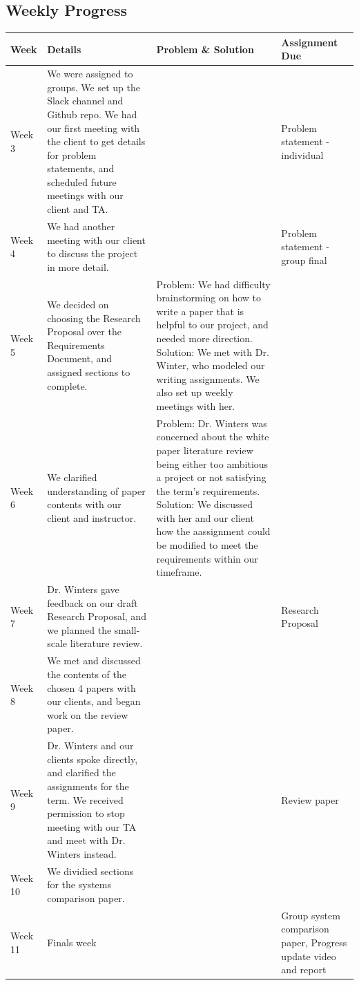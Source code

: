 \documentclass[onecolumn, draftclsnofoot,10pt, compsoc]{IEEEtran}
\begin{document}
\subsection{Weekly Progress}
\begin{tabular}{l | p{5 cm} | p{6 cm}  | p{5 cm} }
    Week & Details & Problem \& Solution & Assignment Due \\ \hline
    Week 3 & We were assigned to groups. We set up the Slack channel and Github repo. We had our first meeting with the client to get details for problem statements, and scheduled future meetings with our client and TA.& & Problem statement - individual \\
    Week 4 & We had another meeting with our client to discuss the project in more detail.& & Problem statement - group final \\
    Week 5 & We decided on choosing the Research Proposal over the Requirements Document, and assigned sections to complete.& Problem: We had difficulty brainstorming on how to write a paper that is helpful to our project, and needed more direction. Solution: We met with Dr. Winter, who modeled our writing assignments. We also set up weekly meetings with her.& \\
    Week 6 & We clarified understanding of paper contents with our client and instructor. & Problem: Dr. Winters was concerned about the white paper literature review being either too ambitious a project or not satisfying the term's requirements. Solution: We discussed with her and our client how the aassignment could be modified to meet the requirements within our timeframe.& \\
    Week 7 & Dr. Winters gave feedback on our draft Research Proposal, and we planned the small-scale literature review. & & Research Proposal \\
    Week 8 & We met and discussed the contents of the chosen 4 papers with our clients, and began work on the review paper.& & \\
    Week 9 & Dr. Winters and our clients spoke directly, and clarified the assignments for the term. We received permission to stop meeting with our TA and meet with Dr. Winters instead.& & Review paper\\
    Week 10 & We dividied sections for the systems comparison paper. & & \\
    Week 11 & Finals week & & Group system comparison paper, Progress update video and report \\
\end{tabular}

\nocite{*}


\end{document}
